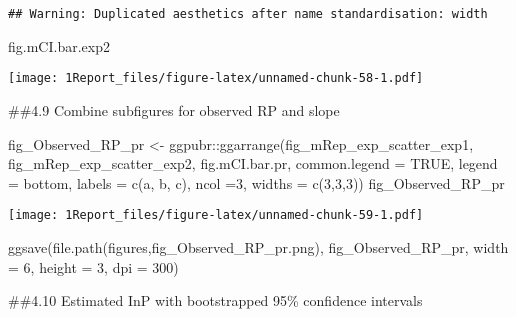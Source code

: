 \documentclass[
]{article}
\newenvironment{Shaded}{\begin{snugshade}}{\end{snugshade}}
\newcommand{\AttributeTok}[1]{\textcolor[rgb]{0.77,0.63,0.00}{#1}}
\newcommand{\ConstantTok}[1]{\textcolor[rgb]{0.00,0.00,0.00}{#1}}
\newcommand{\DecValTok}[1]{\textcolor[rgb]{0.00,0.00,0.81}{#1}}
\newcommand{\FunctionTok}[1]{\textcolor[rgb]{0.00,0.00,0.00}{#1}}
\newcommand{\NormalTok}[1]{#1}
\newcommand{\OtherTok}[1]{\textcolor[rgb]{0.56,0.35,0.01}{#1}}
\newcommand{\SpecialCharTok}[1]{\textcolor[rgb]{0.00,0.00,0.00}{#1}}
\newcommand{\StringTok}[1]{\textcolor[rgb]{0.31,0.60,0.02}{#1}}
\begin{document}
\begin{verbatim}
## Warning: Duplicated aesthetics after name standardisation: width
\end{verbatim}

\begin{Shaded}
\begin{Highlighting}[]
\NormalTok{fig.mCI.bar.exp2}
\end{Highlighting}
\end{Shaded}

\texttt{[image: 1Report\_files/figure-latex/unnamed-chunk-58-1.pdf]}

\#\#4.9 Combine subfigures for observed RP and slope

\begin{Shaded}
\begin{Highlighting}[]
\NormalTok{fig\_Observed\_RP\_pr }\OtherTok{\textless{}{-}}\NormalTok{ ggpubr}\SpecialCharTok{::}\FunctionTok{ggarrange}\NormalTok{(fig\_mRep\_exp\_scatter\_exp1, fig\_mRep\_exp\_scatter\_exp2, fig.mCI.bar.pr, }\AttributeTok{common.legend =} \ConstantTok{TRUE}\NormalTok{, }\AttributeTok{legend =} \StringTok{\textquotesingle{}bottom\textquotesingle{}}\NormalTok{, }\AttributeTok{labels =} \FunctionTok{c}\NormalTok{(}\StringTok{\textquotesingle{}a\textquotesingle{}}\NormalTok{, }\StringTok{\textquotesingle{}b\textquotesingle{}}\NormalTok{, }\StringTok{\textquotesingle{}c\textquotesingle{}}\NormalTok{), }\AttributeTok{ncol =}\DecValTok{3}\NormalTok{, }\AttributeTok{widths =} \FunctionTok{c}\NormalTok{(}\DecValTok{3}\NormalTok{,}\DecValTok{3}\NormalTok{,}\DecValTok{3}\NormalTok{))}
\NormalTok{fig\_Observed\_RP\_pr}
\end{Highlighting}
\end{Shaded}

\texttt{[image: 1Report\_files/figure-latex/unnamed-chunk-59-1.pdf]}

\begin{Shaded}
\begin{Highlighting}[]
\FunctionTok{ggsave}\NormalTok{(}\FunctionTok{file.path}\NormalTok{(}\StringTok{\textquotesingle{}figures\textquotesingle{}}\NormalTok{,}\StringTok{\textquotesingle{}fig\_Observed\_RP\_pr.png\textquotesingle{}}\NormalTok{), fig\_Observed\_RP\_pr, }\AttributeTok{width =} \DecValTok{6}\NormalTok{, }\AttributeTok{height =} \DecValTok{3}\NormalTok{, }\AttributeTok{dpi =} \DecValTok{300}\NormalTok{)}
\end{Highlighting}
\end{Shaded}

\#\#4.10 Estimated InP with bootstrapped 95\% confidence intervals
\end{document}
